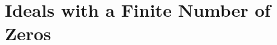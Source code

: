 \section{Ideals with a Finite Number of Zeros}

\begin{exercise}
    \td \\
\end{exercise}

\begin{solution}
    \td \\
\end{solution}